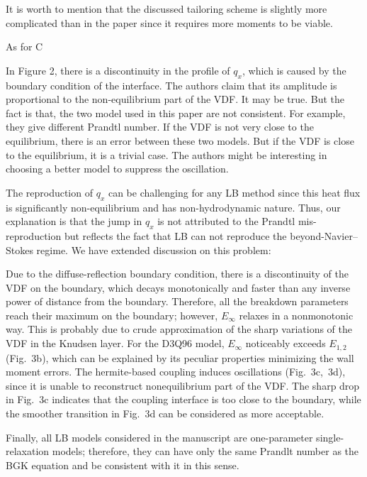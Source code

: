 \documentclass{article}
\begin{document}
It is worth to mention that the discussed tailoring scheme is slightly more complicated than in the paper
since it requires more moments to be viable.

As for C

\begin{quoting}
    In Figure 2, there is a discontinuity in the profile of \(q_x\), which is caused by the boundary condition of the interface.
    The authors claim that its amplitude is proportional to the non-equilibrium part of the VDF. It may be true.
    But the fact is that, the two model used in this paper are not consistent.
    For example, they give different Prandtl number.
    If the VDF is not very close to the equilibrium, there is an error between these two models.
    But if the VDF is close to the equilibrium, it is a trivial case.
    The authors might be interesting in choosing a better model to suppress the oscillation.
\end{quoting}

The reproduction of \(q_x\) can be challenging for any LB method
since this heat flux is significantly non-equilibrium and has non-hydrodynamic nature.
Thus, our explanation is that the jump in \(q_x\) is not attributed to the Prandtl mis-reproduction
but reflects the fact that LB can not reproduce the beyond-Navier--Stokes regime.
We have extended discussion on this problem:

\begin{leftbar}
    Due to the diffuse-reflection boundary condition, there is a discontinuity of the VDF on the boundary,
    which decays monotonically and faster than any inverse power of distance from the boundary.
    Therefore, all the breakdown parameters reach their maximum on the boundary;
    however, \(E_\infty\) relaxes in a nonmonotonic way.
    This is probably due to crude approximation of the sharp variations of the VDF in the Knudsen layer.
    For the D3Q96 model, \(E_\infty\) noticeably exceeds \(E_{1,2}\) (Fig.~3b),
    which can be explained by its peculiar properties minimizing the wall moment errors.
    The hermite-based coupling induces oscillations (Fig.~3c,~3d),
    since it is unable to reconstruct nonequilibrium part of the VDF.
    The sharp drop in Fig.~3c indicates that the coupling interface is too close to the boundary,
    while the smoother transition in Fig.~3d can be considered as more acceptable.
\end{leftbar}

Finally, all LB models considered in the manuscript are one-parameter single-relaxation models;
therefore, they can have only the same Prandlt number as the BGK equation
and be consistent with it in this sense.


\printbibliography
\end{document}
